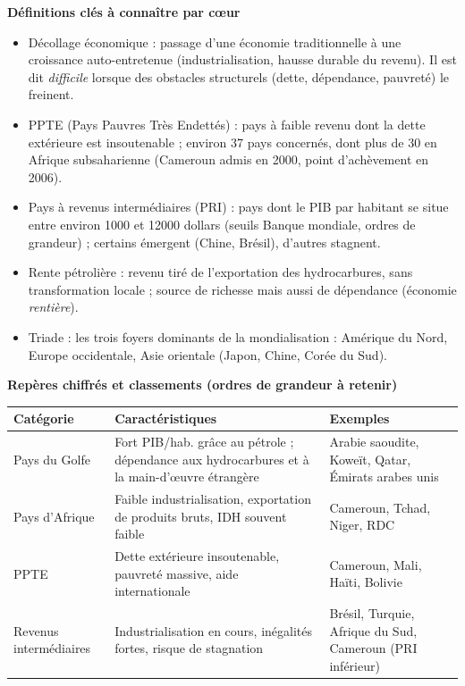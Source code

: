 \documentclass[11pt]{article}
\newcommand{\cle}[1]{{\popxbold\color{popdark}#1}}
\begin{document}
\begin{bilan}
\textbf{Définitions clés à connaître par cœur}
\begin{itemize}
\item \cle{Décollage économique} : passage d'une économie traditionnelle à une croissance auto-entretenue (industrialisation, hausse durable du revenu). Il est dit \emph{difficile} lorsque des obstacles structurels (dette, dépendance, pauvreté) le freinent.
\item \cle{PPTE} (Pays Pauvres Très Endettés) : pays à faible revenu dont la dette extérieure est insoutenable ; environ 37 pays concernés, dont plus de 30 en Afrique subsaharienne (Cameroun admis en 2000, point d'achèvement en 2006).
\item \cle{Pays à revenus intermédiaires} (PRI) : pays dont le PIB par habitant se situe entre environ \num{1000} et \num{12000} dollars (seuils Banque mondiale, ordres de grandeur) ; certains émergent (Chine, Brésil), d'autres stagnent.
\item \cle{Rente pétrolière} : revenu tiré de l'exportation des hydrocarbures, sans transformation locale ; source de richesse mais aussi de dépendance (économie \emph{rentière}).
\item \cle{Triade} : les trois foyers dominants de la mondialisation : Amérique du Nord, Europe occidentale, Asie orientale (Japon, Chine, Corée du Sud).
\end{itemize}

\textbf{Repères chiffrés et classements (ordres de grandeur à retenir)}
\begin{center}
\begin{tabularx}{\linewidth}{|l|X|X|}
\hline
\rowcolor{popblueL} \textbf{Catégorie} & \textbf{Caractéristiques} & \textbf{Exemples} \\
\hline
Pays du Golfe & Fort PIB/hab. grâce au pétrole ; dépendance aux hydrocarbures et à la main-d'œuvre étrangère & Arabie saoudite, Koweït, Qatar, Émirats arabes unis \\
\hline
Pays d'Afrique & Faible industrialisation, exportation de produits bruts, IDH souvent faible & Cameroun, Tchad, Niger, RDC \\
\hline
PPTE & Dette extérieure insoutenable, pauvreté massive, aide internationale & Cameroun, Mali, Haïti, Bolivie \\
\hline
Revenus intermédiaires & Industrialisation en cours, inégalités fortes, risque de stagnation & Brésil, Turquie, Afrique du Sud, Cameroun (PRI inférieur) \\
\hline
\end{tabularx}
\end{center}


\end{bilan}
\end{document}
